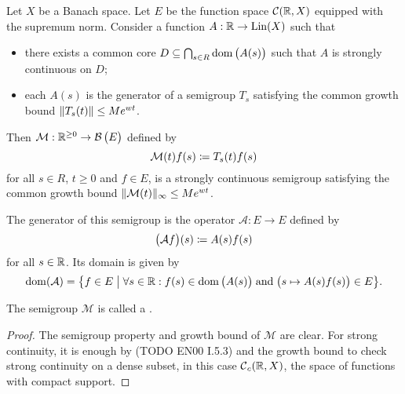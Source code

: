 \begin{proposition}
Let $X$ be a Banach space. Let $E$ be the function space $\operatorname{\mathcal{C}}(\mathbb{R},X)$ equipped with the supremum norm. Consider a function $A: \mathbb{R}\to \operatorname{Lin}(X)$ such that
\begin{itemize}
\item there exists a common core $D\subseteq \bigcap_{s\in R}\operatorname{dom}\big(A(s)\big)$ such that $A$ is strongly continuous on $D$;
\item each $A(s)$ is the generator of a semigroup $T_s$ satisfying the common growth bound $\lVert T_s(t)\rVert\leq Me^{wt}$.
\end{itemize}
Then $\mathcal{M}: \mathbb{R}^{\geq 0}\to \operatorname{\mathcal{B}}\big(E\big)$ defined by
\[ \mathcal{M}(t)f(s) \coloneqq T_s(t)f(s) \]
for all $s\in R$, $t\geq 0$ and $f\in E$, is a strongly continuous semigroup satisfying the common growth bound $\lVert\mathcal{M}(t)\rVert_{\infty} \leq Me^{wt}$.

The generator of this semigroup is the operator $\mathcal{A}:E\to E$ defined by
\[ \big(\mathcal{A}f\big)(s) \coloneqq A(s)f(s) \]
for all $s\in \mathbb{R}$. Its domain is given by
\[ \dom(\mathcal{A}) = \setbuilder{f\in E}{\forall s\in \R: f(s)\in \dom\big(A(s)\big)\;\text{and}\; \big(s\mapsto A(s)f(s)\big)\in E}. \]
\end{proposition}
The semigroup $\mathcal{M}$ is called a .
\begin{proof}
The semigroup property and growth bound of $\mathcal{M}$ are clear. For strong continuity, it is enough by (TODO EN00 I.5.3) and the growth bound to check strong continuity on a dense subset, in this case $\operatorname{\mathcal{C}}_c(\mathbb{R},X)$, the space of functions with compact support.
\end{proof}

